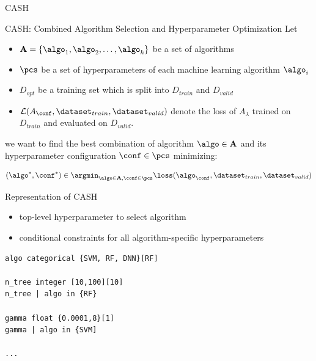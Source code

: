 \begin{frame}[c]{CASH }

\begin{block}{CASH: Combined Algorithm Selection and Hyperparameter Optimization}
Let
\begin{itemize}
  \item $\mathbf{A} = \{\algo_1, \algo_2, \ldots, \algo_k\}$ be a set of algorithms
  \item $\pcs$ be a set of hyperparameters of each machine learning algorithm $\algo_i$
  \item $D_{opt}$ be a training set which is split into $D_{train}$ and $D_{valid}$ 
  \item $\mathcal{L}(A_\conf, \dataset_{train}, \dataset_{valid})$ denote the loss of $A_\lambda$ trained on $D_{train}$ and evaluated on $D_{valid}$.
\end{itemize}
we want to find the best combination of algorithm $\algo \in \mathbf{A}$ and its hyperparameter configuration $\conf \in \pcs$ minimizing:

\begin{equation}
(\algo^*, \conf^*) \in \argmin_{\algo \in \mathbf{A}, \conf \in \pcs} \loss(\algo_\conf, \dataset_{train}, \dataset_{valid}) \nonumber
\end{equation}

\end{block}

\end{frame}
\begin{frame}[c, fragile]{Representation of CASH}

\begin{itemize}
  \item top-level hyperparameter to select algorithm
  \item conditional constraints for all algorithm-specific hyperparameters
\end{itemize}

\pause

\begin{verbatim}
algo categorical {SVM, RF, DNN}[RF]

n_tree integer [10,100][10]
n_tree | algo in {RF}

gamma float {0.0001,8}[1]
gamma | algo in {SVM]

...
\end{verbatim}

\end{frame}

